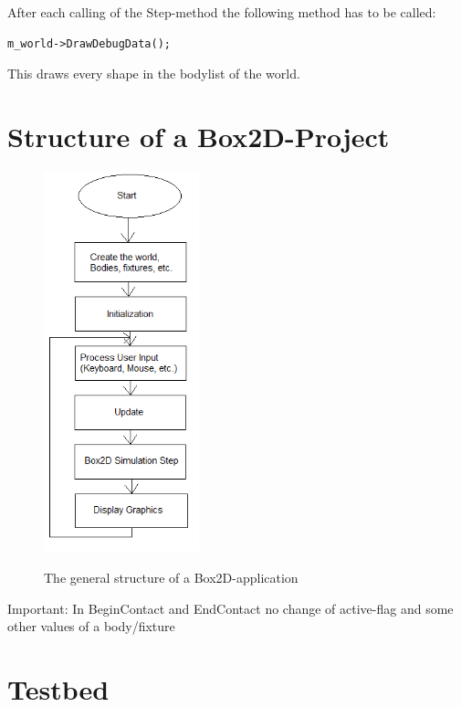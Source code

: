 \documentclass[10pt,a4paper,DIV=11]{scrreprt}
\begin{document}
After each calling of the Step-method the following method has to be called: \\

\begin{lstlisting}[caption={Using debugdraw after each step},label=lst:box2d-ddraw]
m_world->DrawDebugData();
\end{lstlisting}
 
This draws every shape in the bodylist of the world.

\section{Structure of a Box2D-Project}


\begin{center}
	\begin{figure}[H]
		\centering
		\includegraphics[width=0.4\textwidth,scale=0.5]{files/Box2D-structure.png}
		\caption{The general structure of a Box2D-application} \cite{box2d-structure}
		\label{fig:box2d-structure}
	\end{figure}
\end{center}



Important: In BeginContact and EndContact no change of active-flag and some other values of a body/fixture


\section{Testbed}
\end{document}
